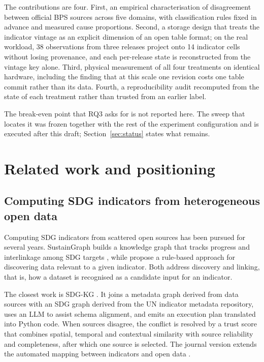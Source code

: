 \documentclass[a4paper,fleqn]{cas-dc}
\begin{document}
The contributions are four. First, an empirical characterisation of disagreement
between official BPS sources across five domains, with classification rules
fixed in advance and measured cause proportions. Second, a storage design that
treats the indicator vintage as an explicit dimension of an open table format;
on the real workload, 38 observations from three releases project onto 14
indicator cells without losing provenance, and each per-release state is
reconstructed from the vintage key alone. Third, physical measurement of all
four treatments on identical hardware, including the finding that at this scale
one revision costs one table commit rather than its data. Fourth, a
reproducibility audit recomputed from the state of each treatment rather than
trusted from an earlier label.

The break-even point that RQ3 asks for is not reported here. The sweep that
locates it was frozen together with the rest of the experiment configuration and
is executed after this draft; Section~\ref{sec:status} states what remains.

\section{Related work and positioning}\label{sec:related}

\subsection{Computing SDG indicators from heterogeneous open data}

Computing SDG indicators from scattered open sources has been pursued for
several years. SustainGraph builds a knowledge graph that tracks progress and
interlinkage among SDG targets \citep{fotopoulou2022sustaingraph}, while
\citet{jiang2023discovery} propose a rule-based approach for discovering data
relevant to a given indicator. Both address discovery and linking, that is, how
a dataset is recognised as a candidate input for an indicator.

The closest work is SDG-KG \citep{benjira2025sdgkg}. It joins a metadata graph
derived from data sources with an SDG graph derived from the UN indicator
metadata repository, uses an LLM to assist schema alignment, and emits an
execution plan translated into Python code. When sources disagree, the conflict
is resolved by a trust score that combines spatial, temporal and contextual
similarity with source reliability and completeness, after which one source is
selected. The journal version extends the automated mapping between indicators
and open data \citep{benjira2025dke}.
\end{document}
